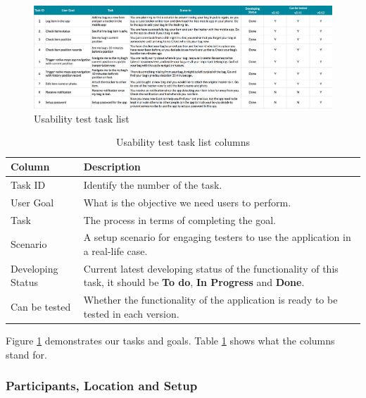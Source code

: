 \documentclass[12pt,a4paper]{article}
\begin{document}
            \begin{figure}[H]
              \centering
              \includegraphics[width=1\textwidth]{../assets/usability-test-task-list.png}
              \caption{Usability test task list}
              \label{fig:Usability test task list}
            \end{figure}

            \begin{table}[H]
              \centering
                \begin{tabularx}{\textwidth}{l X}
                  \hline
                  Column & Description  \\ \hline
                  Task ID & Identify the number of the task.  \\ 
                  User Goal & What is the objective we need users to perform.  \\ 
                  Task & The process in terms of completing the goal.  \\ 
                  Scenario & A setup scenario for engaging testers to use the application in a real-life case.   \\ 
                  Developing Status & Current latest developing status of the functionality of this task, it should be {\bf To do}, {\bf In Progress} and {\bf Done}.\\ 
                  Can be tested &  Whether the functionality of the application is ready to be tested in each version.\\ 
                  \hline
                \end{tabularx}
                \caption[Table caption text]{Usability test task list columns}
                \label{table:Usability test task list columns}
            \end{table}

            Figure \ref{fig:Usability test task list} demonstrates our tasks and goals. Table \ref{table:Usability test task list columns} shows what the columns stand for.

        \subsubsection{Participants, Location and Setup}
\end{document}
